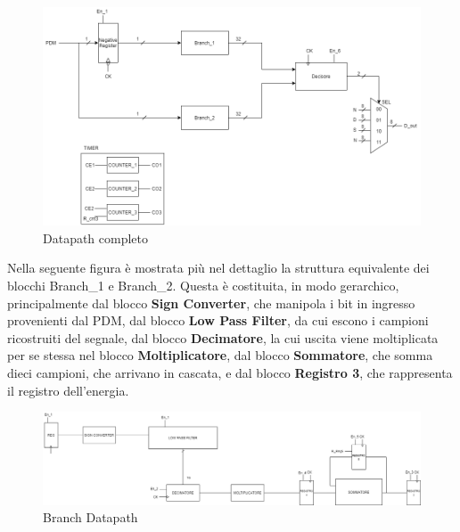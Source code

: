 \documentclass[a4paper, titlepage]{article}
\begin{document}
\begin{figure}[H]
    \centering
    \includegraphics[width=1\textwidth]{DP_completoV2.png}
    \caption{Datapath completo}
    \label{fig:DP_completo}
\end{figure}
\noindent Nella seguente figura è mostrata più nel dettaglio la struttura equivalente dei blocchi Branch\_1 e Branch\_2. Questa è costituita, in modo gerarchico, principalmente dal blocco \textbf{Sign Converter}, che manipola i bit in ingresso provenienti dal PDM, dal blocco \textbf{Low Pass Filter}, da cui escono i campioni ricostruiti del segnale, dal blocco \textbf{Decimatore}, la cui uscita viene moltiplicata per se stessa nel blocco \textbf{Moltiplicatore}, dal blocco \textbf{Sommatore}, che somma dieci campioni, che arrivano in cascata, e dal blocco \textbf{Registro 3}, che rappresenta il registro dell'energia.
\begin{figure}[H]
    \centering
    \includegraphics[width=1\textwidth]{Datapath_micV3.png}
    \caption{Branch Datapath}
    \label{fig:BrDP}
\end{figure}
\end{document}
